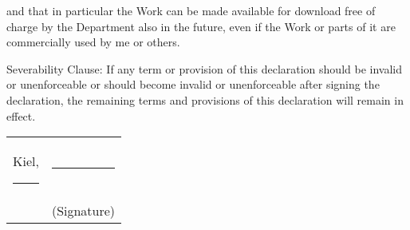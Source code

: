 \documentclass[11pt,oneside]{article}
\begin{document}
and that in particular the Work can be made available for download free of charge
by the Department also in the future,
even if the Work or parts of it are commercially used by me or others.
%
%
%
\par\medskip\small
Severability Clause:
If any term or provision of this declaration should be invalid or unenforceable
or should become invalid or unenforceable after signing the declaration,
the remaining terms and provisions of this declaration will remain in effect.
\normalsize\par\bigskip\bigskip\medskip
\begin{tabular}{@{}p{}@{}p{}@{}}
  Kiel, \rule{10em}{.3pt} & \hfill\rule{12em}{.3pt} \\
  & \hfill\begin{minipage}{12em}\centering(Signature)\end{minipage}
\end{tabular}
\end{document}
